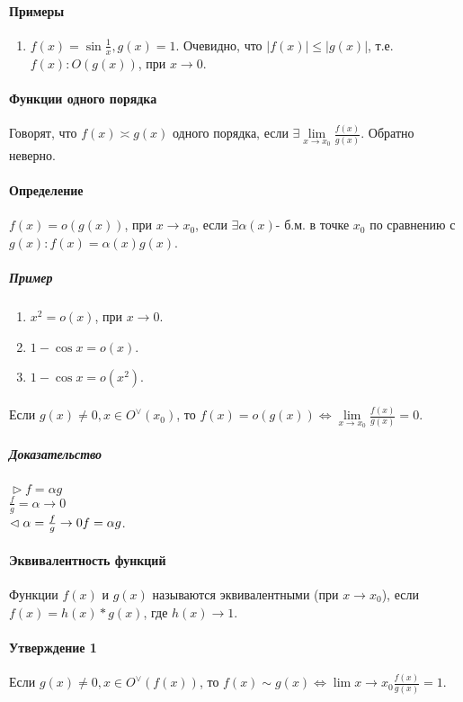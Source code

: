 \documentclass[10pt]{article}
\begin{document}
		\paragraph{Примеры}
		\begin{enumerate}
			\item $f(x) = \sin \frac{1}{x},g(x) = 1$. Очевидно, что $|f(x)| \leq |g(x)|$, т.е. $f(x) : O(g(x))$, при $x \to 0$.
		\end{enumerate}
		\paragraph{Функции одного порядка}
		Говорят, что $f(x) \asymp g(x)$ одного порядка, если $\exists \lim\limits_{x\to x_0} \frac{f(x)}{g(x)}$. Обратно неверно.
		\paragraph{Определение}
		$f(x) = o(g(x))$, при $x\to x_0$, если $\exists \alpha(x)$- б.м. в точке $x_0$ по сравнению с $g(x) : f(x) = \alpha(x)g(x)$.
			\subparagraph{Пример}
			\begin{enumerate}
				\item $x^2 = o(x)$, при $x\to 0$.
				\item $1-\cos x = o(x)$.
				\item $1 - \cos x = o(x^2)$.
			\end{enumerate}
		\paragraph{}
		Если $g(x) \neq 0, x \in O^\vee(x_0)$, то $f(x) = o(g(x)) \Leftrightarrow \lim\limits_{x\to x_0} \frac{f(x)}{g(x)} = 0$.
			\subparagraph{Доказательство}
			$\vartriangleright f = \alpha g$\\
			$\frac{f}{g} = \alpha \to 0$\\
			$\vartriangleleft \alpha = \frac{f}{g} \to 0\\ f = \alpha g$.
		
		\paragraph{Эквивалентность функций}
		Функции $f(x)$ и $g(x)$ называются эквивалентными (при $x \to x_0$), если $f(x) = h(x)*g(x)$, где $h(x) \to 1$.
		\paragraph{Утверждение 1}
		Если $g(x) \neq 0, x \in O^\vee(f(x))$, то $f(x) \sim g(x) \Leftrightarrow \lim\limits{x \to x_0} \frac{f(x)}{g(x)} = 1$.
\end{document}

